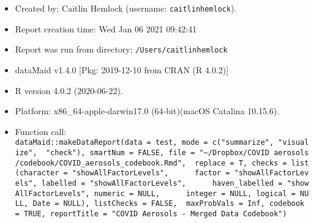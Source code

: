 \documentclass[]{article}
\begin{document}
\begin{itemize}
\item
  Created by: Caitlin Hemlock (username: \texttt{caitlinhemlock}).
\item
  Report creation time: Wed Jan 06 2021 09:42:41
\item
  Report was run from directory: \texttt{/Users/caitlinhemlock}
\item
  dataMaid v1.4.0 {[}Pkg: 2019-12-10 from CRAN (R 4.0.2){]}
\item
  R version 4.0.2 (2020-06-22).
\item
  Platform: x86\_64-apple-darwin17.0 (64-bit)(macOS Catalina 10.15.6).
\item
  Function call:
  \texttt{dataMaid::makeDataReport(data\ =\ test,\ mode\ =\ c("summarize",\ "visualize",\ \ "check"),\ smartNum\ =\ FALSE,\ file\ =\ "\textasciitilde{}/Dropbox/COVID\ aerosols/codebook/COVID\_aerosols\_codebook.Rmd",\ \ replace\ =\ T,\ checks\ =\ list(character\ =\ "showAllFactorLevels",\ \ \ \ \ \ factor\ =\ "showAllFactorLevels",\ labelled\ =\ "showAllFactorLevels",\ \ \ \ \ \ haven\_labelled\ =\ "showAllFactorLevels",\ numeric\ =\ NULL,\ \ \ \ \ \ integer\ =\ NULL,\ logical\ =\ NULL,\ Date\ =\ NULL),\ listChecks\ =\ FALSE,\ \ maxProbVals\ =\ Inf,\ codebook\ =\ TRUE,\ reportTitle\ =\ "COVID\ Aerosols\ -\ Merged\ Data\ Codebook")}
\end{itemize}
\end{document}
